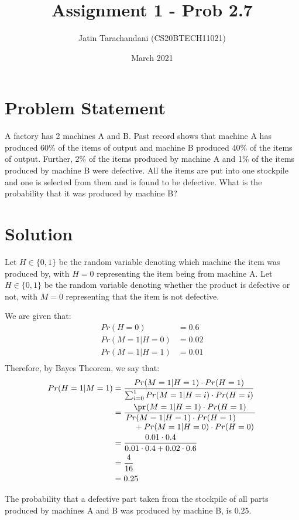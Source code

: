 \documentclass[twocolumn]{article}
\title{Assignment 1 - Prob 2.7}
\author{Jatin Tarachandani (CS20BTECH11021)}
\date{March 2021}
\begin{document}
\maketitle

\section{Problem Statement}
A factory has 2 machines A and B. Past record shows that machine A has produced 60\% of the items of output and machine B produced 40\% of the items of output. Further, 2\% of the items produced by machine A and 1\% of the items produced by machine B were defective. All the items are put into one stockpile and one is selected from them and is found to be defective. What is the probability that it was produced by machine B? 
\section{Solution}
Let $H \in \{0,1\}$ be the random variable denoting which machine the item was produced by, with $H=0$ representing the item being from machine A. Let $H \in \{0,1\}$ be the random variable denoting whether the product is defective or not, with $M=0$ representing that the item is not defective. 

We are given that:
\begin{align*}
Pr(H=0)&=0.6\\
Pr(M=1|H=0)&=0.02\\
Pr(M=1|H=1)&=0.01\\
\end{align*}
Therefore, by Bayes Theorem, we say that:
\begin{align*}
Pr(H=1\vert M=1)&=\frac{Pr(M=1\vert H=1)\cdot Pr(H=1)}{\sum_{i=0}^{1} Pr(M=1\vert H=i)\cdot Pr(H=i)}\\
&=\frac{\pr(M=1 \vert H=1)\cdot Pr(H=1)}{\splitfrac{Pr(M=1\vert H=1)\cdot Pr(H=1)}{+Pr(M=1\vert H=0)\cdot Pr(H=0)}}\\
&=\dfrac{0.01\cdot 0.4}{0.01\cdot 0.4 + 0.02\cdot 0.6}\\
&=\dfrac{4}{16}\\
&=0.25
\end{align*}

The probability that a defective part taken from the stockpile of all parts produced by machines A and B was produced by machine B, is 0.25.
\end{document}
